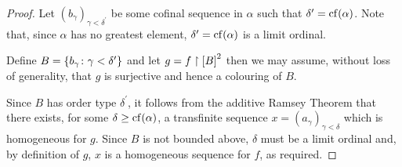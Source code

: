 \begin{proof}
	Let $(b_\gamma)_{\gamma<\delta^\prime}$ be some cofinal sequence in $\alpha$
	such that $\delta^\prime=\cf(\alpha)$.  Note that, since $\alpha$ has no
	greatest element, $\delta^\prime=\cf(\alpha)$ is a limit ordinal.

	Define $B=\setbuild{b_\gamma}{\gamma<\delta^\prime}$ and let
	$g=f\restriction{\subsets{2}{B}}$ then we may assume, without loss of
	generality, that $g$ is surjective and hence a colouring of $B$.

	Since $B$ has order type $\delta^\prime$, it follows from the additive
	Ramsey Theorem that there exists, for some $\delta\geq\cf(\alpha)$, a
	transfinite sequence $x=(a_\gamma)_{\gamma<\delta}$ which is homogeneous for
	$g$.  Since $B$ is not bounded above, $\delta$ must be a limit ordinal and,
	by definition of $g$, $x$ is a homogeneous sequence for $f$, as required.
\end{proof}




